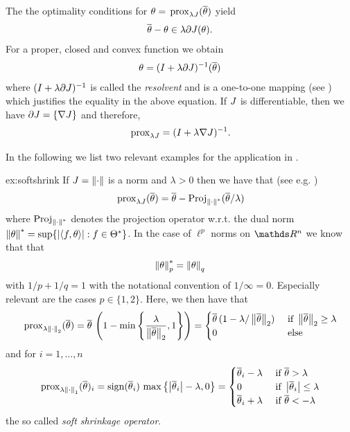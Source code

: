 %
\begin{remark}{}{}
	The the optimality conditions for $\theta=\,\mathrm{prox}_{\lambda J}(\overline{\theta})$ yield 
	\begin{align*}
		\pparam - \param \in \lambda \partial \func(\param).%
	\end{align*}
	For a proper, closed and convex function we obtain
	\begin{align*}
		\theta = (I + \lambda\partial J)^{-1}(\overline\theta)
	\end{align*}
	where $(I + \lambda\partial J)^{-1}$ is called the \emph{resolvent} and is a one-to-one mapping (see \cite[Ch. 3.2]{parikh2014proximal})  which justifies the equality in the above equation. If $J$ is differentiable, then we have $\partial J = \{\nabla J\}$ and therefore,
	\begin{align*}
		\,\mathrm{prox}_{\lambda J} = (I + \lambda\nabla J)^{-1}.
	\end{align*}
\end{remark}
%
%
\noindent%
In the following we list two relevant examples for the application in \cite{bungert2022bregman, bungert2021neural}.
%
\begin{example}{}{ex:softshrink}
	If $J=\left\|\cdot\right\|$ is a norm and $\lambda>0$ then we have that (see e.g. \cite{parikh2014proximal})
	\begin{align*}
		\,\mathrm{prox}_{\lambda J}(\overline\theta) = 
		\overline\theta - \operatorname{Proj}_{\left\|\cdot\right\|^\ast}(\overline\theta/\lambda)
	\end{align*}
	where $\operatorname{Proj}_{\left\|\cdot\right\|^\ast}$ denotes the projection operator w.r.t. the dual norm $\left\|\theta\right\|^\ast = \sup\{\left|\langle f , \theta\rangle\right|: f\in\Theta^\ast\}$. In the case of $\ell^p$ norms on $\R^n$ we know that that 
	\begin{align*}
		\left\|\theta\right\|_p^\ast = \left\|\theta\right\|_q
	\end{align*}
	with $1/p + 1/q = 1$ with the notational convention of $1/\infty=0$. Especially relevant are the cases $p\in\{1,2\}$. Here, we then have that
	\begin{align*}
		\,\mathrm{prox}_{\lambda\left\|\cdot\right\|_2}(\overline\theta) = 
		\overline\theta\,\left(1 - \min\left\{\frac{\lambda}{\left\|\overline\theta\right\|_2}, 1\right\}\right)=
		\begin{cases}
			\overline\theta\,(1 - \lambda/\left\|\overline\theta\right\|_2) &\text{ if } \left\|\overline\theta\right\|_2 \geq \lambda\\
			0 &\text{ else}
		\end{cases}
	\end{align*}
	and for $i=1,\ldots,n$
	\begin{align*}
		\,\mathrm{prox}_{\lambda\left\|\cdot\right\|_1}(\overline\theta)_i
		= \operatorname*{sign}(\overline\theta_i)\, \max\left\{\left|\overline\theta_i\right| - \lambda, 0\right\} =
		\begin{cases}
			\overline\theta_i -\lambda &\text{ if }\overline\theta > \lambda\\
			0 &\text{ if } \left|\overline\theta_i\right|\leq \lambda\\
			\overline\theta_i +\lambda &\text{ if }\overline\theta < -\lambda
		\end{cases}
	\end{align*}
	the so called \emph{soft shrinkage operator}. 
\end{example}
